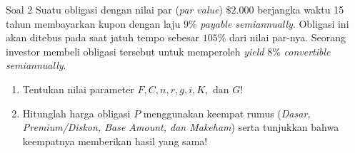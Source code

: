 \documentclass[11pt,a4paper]{article}
\begin{document}
\begin{problembox}{Soal 2}
Suatu obligasi dengan nilai par (\textit{par value}) $\$2.000$ berjangka waktu 15 tahun membayarkan kupon dengan laju $9\%$ \textit{payable semiannually}. Obligasi ini akan ditebus pada saat jatuh tempo sebesar $105\%$ dari nilai par-nya. Seorang investor membeli obligasi tersebut untuk memperoleh \textit{yield} $8\%$ \textit{convertible semiannually}.
\begin{enumerate}[label=(\alph*)]
    \item Tentukan nilai parameter $F, C, n, r, g, i, K,$ dan $G$!
    \item Hitunglah harga obligasi $P$ menggunakan keempat rumus (\textit{Dasar, Premium/Diskon, Base Amount, dan Makeham}) serta tunjukkan bahwa keempatnya memberikan hasil yang sama!
\end{enumerate}
\end{problembox}
\end{document}
